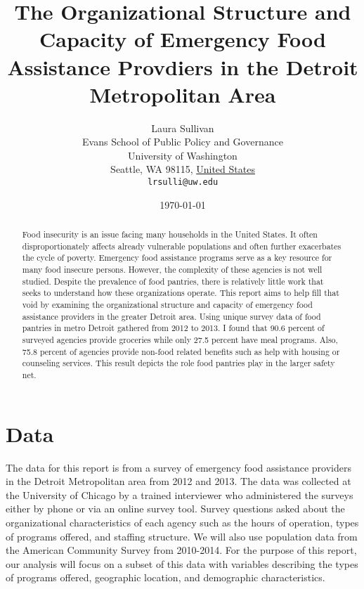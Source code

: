 \documentclass[11pt]{article}
\title{The Organizational Structure and Capacity of Emergency Food Assistance Provdiers in the Detroit Metropolitan Area}
\author{
        Laura Sullivan\\
        Evans School of Public Policy and Governance\\
        University of Washington\\
        Seattle, WA 98115, \underline{United States}\\
        \texttt{lrsulli@uw.edu}
}
\date{\today}
\begin{document}


\maketitle


\begin{abstract}
Food insecurity is an issue facing many households in the United States. It often disproportionately affects already vulnerable populations and often further exacerbates the cycle of poverty. Emergency food assistance programs serve as a key resource for many food insecure persons. However, the complexity of these agencies is not well studied. Despite the prevalence of food pantries, there is relatively little work that seeks to understand how these organizations operate. This report aims to help fill that void by examining the organizational structure and capacity of emergency food assistance providers in the greater Detroit area. Using unique survey data of food pantries in metro Detroit gathered from 2012 to 2013. I found that 90.6 percent of surveyed agencies provide groceries while only 27.5 percent have meal programs. Also, 75.8 percent of agencies provide non-food related benefits such as help with housing or counseling services. This result depicts the role food pantries play in the larger safety net.
\end{abstract}

\section{Data}\label{intro}
The data for this report is from a survey of emergency food assistance providers in the Detroit Metropolitan area from 2012 and 2013. The data was collected at the University of Chicago by a trained interviewer who administered the surveys either by phone or via an online survey tool. Survey questions asked about the organizational characteristics of each agency such as the hours of operation, types of programs offered, and staffing structure. We will also use population data from the American Community Survey from 2010-2014. For the purpose of this report, our analysis will focus on a subset of this data with variables describing the types of programs offered, geographic location, and demographic characteristics.
\end{document}
